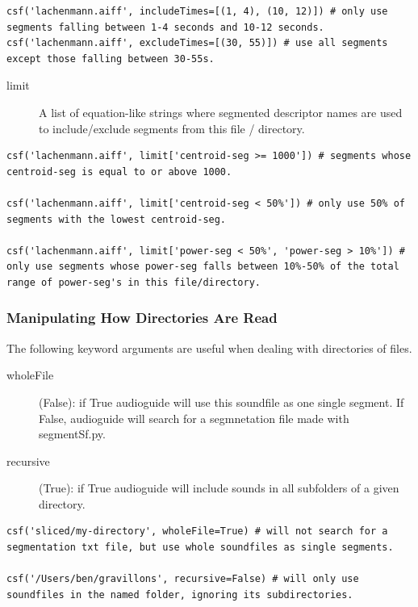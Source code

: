 \documentclass{article}
\begin{document}
\begin{spacing}{1.2}
\begin{lstlisting}
csf('lachenmann.aiff', includeTimes=[(1, 4), (10, 12)]) # only use segments falling between 1-4 seconds and 10-12 seconds.
csf('lachenmann.aiff', excludeTimes=[(30, 55)]) # use all segments except those falling between 30-55s.
\end{lstlisting}

\begin{description}
\item[limit] A list of equation-like strings where segmented descriptor names are used to include/exclude segments from this file / directory.
\end{description}
\begin{lstlisting}
csf('lachenmann.aiff', limit['centroid-seg >= 1000']) # segments whose centroid-seg is equal to or above 1000.

csf('lachenmann.aiff', limit['centroid-seg < 50%']) # only use 50% of segments with the lowest centroid-seg.

csf('lachenmann.aiff', limit['power-seg < 50%', 'power-seg > 10%']) # only use segments whose power-seg falls between 10%-50% of the total range of power-seg's in this file/directory.
\end{lstlisting}



\subsubsection{Manipulating How Directories Are Read}
The following keyword arguments are useful when dealing with directories of files.
\begin{description}
\item[wholeFile] (False): if True audioguide will use this soundfile as one single segment.  If False, audioguide will search for a segmnetation file made with segmentSf.py.

\item[recursive] (True): if True audioguide will include sounds in all subfolders of a given directory.
\end{description}

\begin{lstlisting}
csf('sliced/my-directory', wholeFile=True) # will not search for a segmentation txt file, but use whole soundfiles as single segments.

csf('/Users/ben/gravillons', recursive=False) # will only use soundfiles in the named folder, ignoring its subdirectories.
\end{lstlisting}


\end{spacing}
\end{document}
